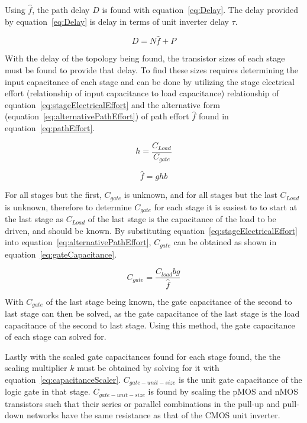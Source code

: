 \documentclass[conference]{IEEEtran}
\begin{document}
Using $\hat{f}$, the path delay $D$ is found with equation~\ref{eq:Delay}. The delay provided by equation~\ref{eq:Delay} is delay in terms of unit inverter delay $\tau$. 

\begin{equation}
D = N\hat{f}+P
\label{eq:Delay}
\end{equation}

With the delay of the topology being found, the transistor sizes of each stage must be found to provide that delay. To find these sizes requires determining the input capacitance of each stage and can be done by utilizing the stage electrical effort (relationship of input capacitance to load capacitance) relationship of equation~\ref{eq:stageElectricalEffort} and the alternative form (equation~\ref{eq:alternativePathEffort}) of path effort $\hat{f}$ found in equation~\ref{eq:pathEffort}.

\begin{equation} 
h = \frac{C_{Load}}{C_{gate}}
\label{eq:stageElectricalEffort}
\end{equation}

\begin{equation}
\hat{f} = ghb
\label{eq:alternativePathEffort}
\end{equation}

For all stages but the first, $C_{gate}$ is unknown, and for all stages but the last $C_{Load}$ is unknown, therefore to determine $C_{gate}$ for each stage it is easiest to to start at the last stage as $C_{Load}$ of the last stage is the capacitance of the load to be driven, and should be known. By substituting equation~\ref{eq:stageElectricalEffort} into equation~\ref{eq:alternativePathEffort}, $C_{gate}$ can be obtained as shown in equation~\ref{eq:gateCapacitance}.

\begin{equation}
C_{gate} = \frac{C_{load} b g}{\hat{f}} 
\label{eq:gateCapacitance}
\end{equation}

With $C_{gate}$ of the last stage being known, the gate capacitance of the second to last stage can then be solved, as the gate capacitance of the last stage is the load capacitance of the second to last stage. Using this method, the gate capacitance of each stage can solved for.  

Lastly with the scaled gate capacitances found for each stage found, the the scaling multiplier $k$ must be obtained by solving for it with equation~\ref{eq:capacitanceScaler}. $C_{gate-unit-size}$ is the unit gate capacitance of the logic gate in that stage. $C_{gate-unit-size}$ is found by scaling the pMOS and nMOS transistors such that their series or parallel combinations in the pull-up and pull-down networks have the same resistance as that of the CMOS unit inverter. 
\end{document}
